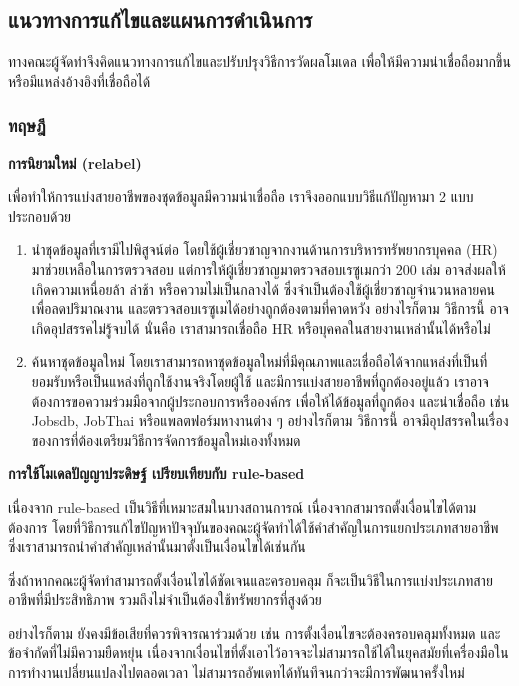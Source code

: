 \subsection{แนวทางการแก้ไขและแผนการดำเนินการ}
ทางคณะผู้จัดทำจึงคิดแนวทางการแก้ไขและปรับปรุงวิธีการวัดผลโมเดล เพื่อให้มีความน่าเชื่อถือมากขึ้น หรือมีแหล่งอ้างอิงที่เชื่อถือได้

\subsubsection{ทฤษฎี}
\textbf{การนิยามใหม่ (relabel)}

เพื่อทำให้การแบ่งสายอาชีพของชุดข้อมูลมีความน่าเชื่อถือ เราจึงออกแบบวิธีแก้ปัญหามา 2 แบบ ประกอบด้วย

\begin{enumerate}
    \item นำชุดข้อมูลที่เรามีไปพิสูจน์ต่อ โดยใช้ผู้เชี่ยวชาญจากงานด้านการบริหารทรัพยากรบุคคล (HR) มาช่วยเหลือในการตรวจสอบ แต่การให้ผู้เชี่ยวชาญมาตรวจสอบเรซูเมกว่า 200 เล่ม อาจส่งผลให้เกิดความเหนื่อยล้า ล่าช้า หรือความไม่เป็นกลางได้ ซึ่งจำเป็นต้องใช้ผู้เชี่ยวชาญจำนวนหลายคนเพื่อลดปริมาณงาน และตรวจสอบเรซูเมได้อย่างถูกต้องตามที่คาดหวัง อย่างไรก็ตาม วิธีการนี้ อาจเกิดอุปสรรคไม่รู้จบได้ นั่นคือ เราสามารถเชื่อถือ HR หรือบุคคลในสายงานเหล่านั้นได้หรือไม่
    \item ค้นหาชุดข้อมูลใหม่ โดยเราสามารถหาชุดข้อมูลใหม่ที่มีคุณภาพและเชื่อถือได้จากแหล่งที่เป็นที่ยอมรับหรือเป็นแหล่งที่ถูกใช้งานจริงโดยผู้ใช้ และมีการแบ่งสายอาชีพที่ถูกต้องอยู่แล้ว เราอาจต้องการขอความร่วมมือจากผู้ประกอบการหรือองค์กร เพื่อให้ได้ข้อมูลที่ถูกต้อง และน่าเชื่อถือ เช่น Jobsdb, JobThai หรือแพลตฟอร์มหางานต่าง ๆ อย่างไรก็ตาม วิธีการนี้ อาจมีอุปสรรคในเรื่องของการที่ต้องเตรียมวิธีการจัดการข้อมูลใหม่เองทั้งหมด    
\end{enumerate}

\textbf{การใช้โมเดลปัญญาประดิษฐ์ เปรียบเทียบกับ rule-based}

\par{
    เนื่องจาก rule-based เป็นวิธีที่เหมาะสมในบางสถานการณ์ เนื่องจากสามารถตั้งเงื่อนไขได้ตามต้องการ โดยที่วิธีการแก้ไขปัญหาปัจจุบันของคณะผู้จัดทำได้ใช้คำสำคัญในการแยกประเภทสายอาชีพ ซึ่งเราสามารถนำคำสำคัญเหล่านั้นมาตั้งเป็นเงื่อนไขได้เช่นกัน
}

\par{
    ซึ่งถ้าหากคณะผู้จัดทำสามารถตั้งเงื่อนไขได้ชัดเจนและครอบคลุม ก็จะเป็นวิธีในการแบ่งประเภทสายอาชีพที่มีประสิทธิภาพ รวมถึงไม่จำเป็นต้องใช้ทรัพยากรที่สูงด้วย
}

\par{
    อย่างไรก็ตาม ยังคงมีข้อเสียที่ควรพิจารณาร่วมด้วย เช่น การตั้งเงื่อนไขจะต้องครอบคลุมทั้งหมด และข้อจำกัดที่ไม่มีความยืดหยุ่น เนื่องจากเงื่อนไขที่ตั้งเอาไว้อาจจะไม่สามารถใช้ได้ในยุคสมัยที่เครื่องมือในการทำงานเปลี่ยนแปลงไปตลอดเวลา ไม่สามารถอัพเดทได้ทันทีจนกว่าจะมีการพัฒนาครั้งใหม่
}

